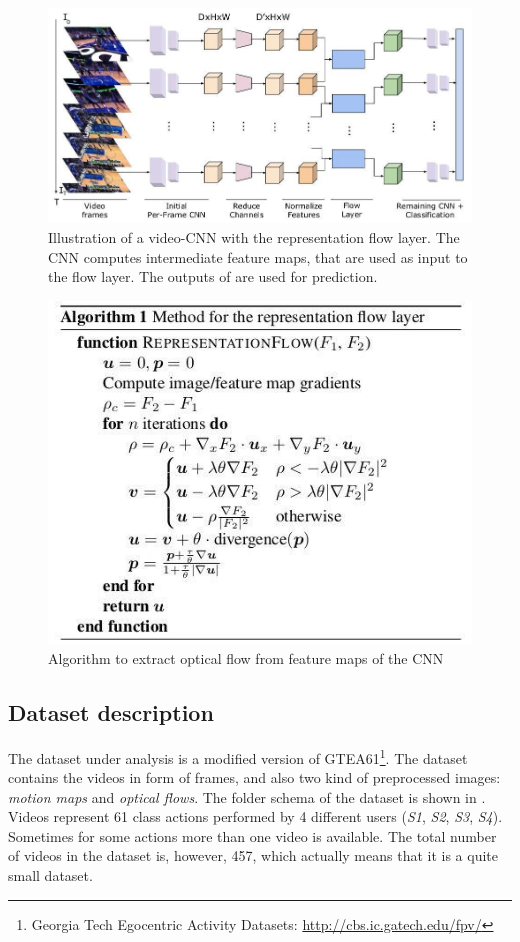 \documentclass[10pt,twocolumn,hidelinks,letterpaper]{article}
\begin{document}
\begin{figure}
  \centering
  \includegraphics[width=.7\linewidth]{images/flow1.jpg}
  \caption{Illustration of a video-CNN with the representation flow layer. The CNN computes intermediate feature maps, that are used as input to the flow layer. The outputs of  are used for prediction.}
  \label{flow1}
\end{figure}
\begin{figure}[t]
  \centering
  \includegraphics[width=\linewidth]{images/flow2.jpg}
  \caption{Algorithm to extract optical flow from feature maps of the CNN}
  \label{flow2}
\end{figure}


\subsection{Dataset description}

The dataset under analysis is a modified version of GTEA61\footnote{Georgia Tech Egocentric Activity Datasets: \small{\url{http://cbs.ic.gatech.edu/fpv/}}}. The dataset contains the videos in form of frames, and also two kind of preprocessed images: \textit{motion maps} and \textit{optical flows}. The folder schema of the dataset is shown in . Videos represent 61 class actions performed by 4 different users (\textit{S1}, \textit{S2}, \textit{S3}, \textit{S4}). Sometimes for some actions more than one video is available. The total number of videos in the dataset is, however, 457, which actually means that it is a quite small dataset.
\end{document}
